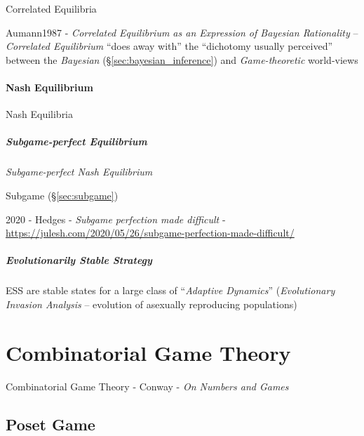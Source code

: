 Correlated Equilibria

Aumann1987 - \emph{Correlated Equilibrium as an Expression of Bayesian
  Rationality} -- \emph{Correlated Equilibrium} ``does away with'' the
``dichotomy usually perceived'' between the \emph{Bayesian}
(\S\ref{sec:bayesian_inference}) and \emph{Game-theoretic} world-views



\paragraph{Nash Equilibrium}\label{sec:nash_equilibrium}\hfill

Nash Equilibria



\subparagraph{Subgame-perfect Equilibrium}\label{sec:subgame_perfect}\hfill

\emph{Subgame-perfect Nash Equilibrium}

Subgame (\S\ref{sec:subgame})

2020 - Hedges - \emph{Subgame perfection made difficult} -
\url{https://julesh.com/2020/05/26/subgame-perfection-made-difficult/}



\subparagraph{Evolutionarily Stable Strategy}
\label{sec:evolutionarily_stable}\hfill

ESS are stable states for a large class of ``\emph{Adaptive Dynamics}''
(\emph{Evolutionary Invasion Analysis} -- evolution of asexually reproducing
populations)




\section{Combinatorial Game Theory}\label{sec:combinatorial_game_theory}

Combinatorial Game Theory - Conway  - \emph{On Numbers and Games}



\subsection{Poset Game}\label{sec:poset_game}

